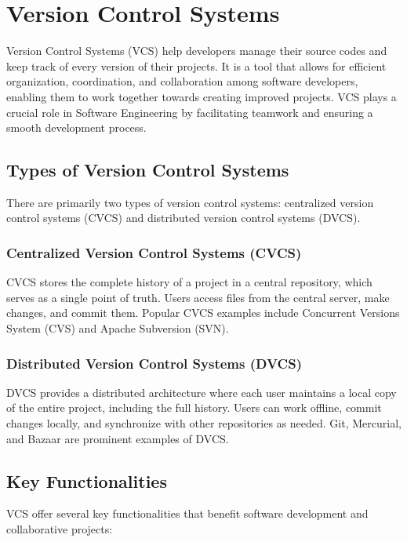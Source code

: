 \section*{Version Control Systems}

Version Control Systems (VCS) help developers manage their source codes and keep track of every version of their projects. It is a tool that allows for efficient organization, coordination, and collaboration among software developers, enabling them to work together towards creating improved projects. VCS plays a crucial role in Software Engineering by facilitating teamwork and ensuring a smooth development process.\cite{zolkifli2018version}

\subsection*{Types of Version Control Systems}

There are primarily two types of version control systems: centralized version control systems (CVCS) and distributed version control systems (DVCS).

\subsubsection*{Centralized Version Control Systems (CVCS)}
CVCS stores the complete history of a project in a central repository, which serves as a single point of truth. Users access files from the central server, make changes, and commit them. Popular CVCS examples include Concurrent Versions System (CVS) and Apache Subversion (SVN).

\subsubsection*{Distributed Version Control Systems (DVCS)}
DVCS provides a distributed architecture where each user maintains a local copy of the entire project, including the full history. Users can work offline, commit changes locally, and synchronize with other repositories as needed. Git, Mercurial, and Bazaar are prominent examples of DVCS.

\newpage

\subsection*{Key Functionalities}

VCS offer several key functionalities that benefit software development and collaborative projects:

